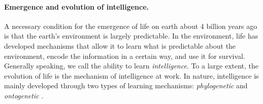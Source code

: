 \documentclass[../../book-main.tex]{subfiles}
\begin{document}
\paragraph{Emergence and evolution of intelligence.}

A necessary condition for the emergence of life on earth about 4 billion years ago is that the earth's environment is largely predictable. In the environment, life has developed mechanisms that allow it to learn what is predictable about the environment, encode the information in a certain way, and use it for survival. Generally speaking, we call the ability to learn {\em intelligence}. To a large extent, the evolution of life is the mechanism of intelligence at work. In nature, intelligence is mainly developed through two types of learning mechanisms: {\em phylogenetic} and {\em ontogenetic} \cite{Wiener-Cybernetics-1961}.%
\end{document}
